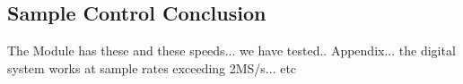 \subsection{Sample Control Conclusion} \label{subsec:SampleControlConclusion} 

The Module has these and these speeds... we have tested.. Appendix... the digital system works at sample rates exceeding 2MS/s... etc